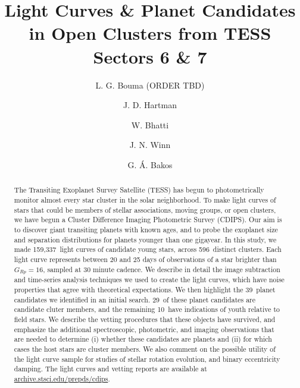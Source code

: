 \documentclass[12pt,twocolumn,tighten]{aastex62}
\newcommand{\numberpcs}{39\ }  %
\newcommand{\numberzaripcs}{10\ }  %
\newcommand{\numberclusterpcs}{29\ }  %
\newcommand{\numberlcs}{159{,}337\ } %
\newcommand{\numberclusters}{596\ } %
\newcommand{\stscilink}{\url{archive.stsci.edu/prepds/cdips}}
\begin{document}
\title{
  Light Curves \& Planet Candidates in Open Clusters from TESS Sectors 6 \& 7
}


\author[0000-0002-0514-5538]{L. G. Bouma (ORDER TBD)}
%
\author[0000-0001-8732-6166]{J. D. Hartman}
%
\author[0000-0002-0628-0088]{W. Bhatti}
%
\author[0000-0002-4265-047X]{J. N. Winn}
%
\author[0000-0001-7204-6727]{G. \'A. Bakos}

\begin{abstract}
  The Transiting Exoplanet Survey Satellite (TESS) has begun to
  photometrically monitor almost every star cluster in
  the solar neighborhood.
  To make light curves of stars that could be members of stellar
  associations, moving groups, or open clusters, we have begun a
  Cluster Difference Imaging Photometric Survey (CDIPS).
  Our aim is to discover giant transiting planets with known
  ages, and to probe the exoplanet size and separation distributions for
  planets younger than one gigayear.
  In this study, we made \numberlcs light curves of candidate young
  stars, across \numberclusters distinct clusters.
  Each light curve represents between 20 and 25 days of observations
  of a star brighter than $G_{Rp}=16$, sampled at 30 minute cadence.
  We describe in detail the image subtraction and time-series analysis 
  techniques we used to create the light curves, which
  have noise properties that agree with theoretical expectations.
  We then highlight the \numberpcs planet candidates we identified in
  an initial search.
  \numberclusterpcs of these planet candidates are candidate cluter
  members, and the remaining \numberzaripcs have indications of youth
  relative to field stars.
  We describe the vetting procedures that these objects have survived,
  and emphasize the additional spectroscopic, photometric, and imaging
  observations that are needed to determine (i) whether these candidates
  are planets and (ii) for which cases the host stars are cluster members.
  We also comment on the possible utility of the light curve sample for
  studies of stellar rotation evolution, and binary eccentricity
  damping.
  The light curves and vetting reports are available at
  \stscilink.
\end{abstract}
\end{document}
